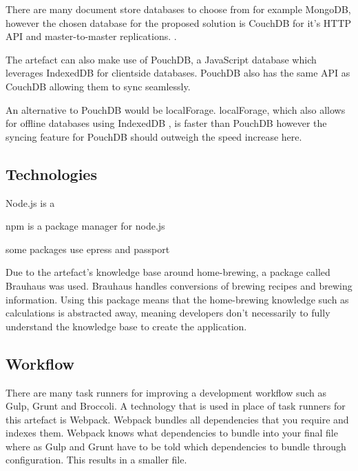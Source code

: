 There are many document store databases to choose from for example MongoDB, however the chosen database for the proposed solution is CouchDB for it's HTTP API and master-to-master replications. \cite{couchdb}. %

The artefact can also make use of PouchDB, a JavaScript database which leverages IndexedDB for clientside databases. PouchDB also has the same API as CouchDB allowing them to sync seamlessly.

An alternative to PouchDB would be localForage. localForage, which also allows for offline databases using IndexedDB , is faster than PouchDB however the syncing feature for PouchDB should outweigh the speed increase here. %

\subsection{Technologies} \label{a--d-technologies}

Node.js is a

npm is a package manager for node.js

some packages use epress and passport




Due to the artefact's knowledge base around home-brewing, a package called Brauhaus was used. Brauhaus handles conversions of brewing recipes and brewing information. Using this package means that the home-brewing knowledge such as calculations is abstracted away, meaning developers don't necessarily to fully understand the knowledge base to create the application. \cite{brauhaus.js}


\subsection{Workflow} \label{a--d-workflow}




There are many task runners for improving a development workflow such as Gulp, Grunt and Broccoli. A technology that is used in place of task runners for this artefact is Webpack. Webpack bundles all dependencies that you require and indexes them. Webpack knows what dependencies to bundle into your final file where as Gulp and Grunt have to be told which dependencies to bundle through configuration. This results in a smaller file. \cite{webpack}

